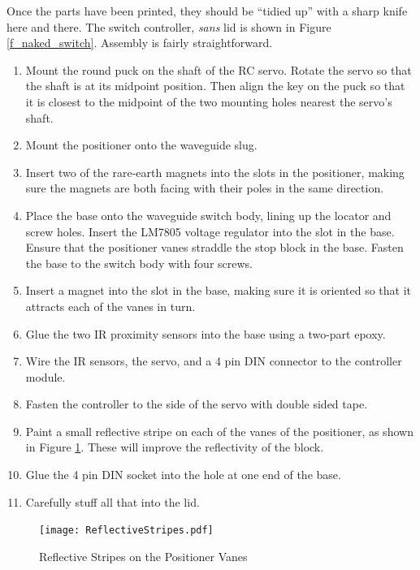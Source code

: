 \documentclass[12pt]{article}
\begin{document}
Once the parts have been printed, they should be ``tidied up'' with
a sharp knife here and there.  
The switch controller, {\em sans} lid is shown in Figure \ref{f_naked_switch}.
Assembly is fairly straightforward.

\begin{enumerate}
\setlength\itemsep{0em}  
\item Mount the round puck on the shaft of the RC servo. Rotate the
  servo so that the shaft is at its midpoint position. Then align
  the key on the puck so that it is closest to the midpoint of the
  two mounting holes nearest the servo's shaft.
\item Mount the positioner onto the waveguide slug.
\item Insert two of the rare-earth magnets into the slots in
  the positioner, making sure the magnets are both facing with
  their poles in the same direction.
\item Place the base onto the waveguide switch body, lining up
  the locator and screw holes. Insert the LM7805 voltage regulator
  into the slot in the base. Ensure that the positioner vanes
  straddle the stop block in the base. Fasten the base to the
  switch body with four screws.
\item Insert a magnet into the slot in the base, making sure
  it is oriented so that it attracts each of the vanes in turn.
\item Glue the two IR proximity sensors into the base using
  a two-part epoxy.
\item Wire the IR sensors, the servo, and a 4 pin DIN connector
  to the controller module.
\item Fasten the controller to the side of the servo with
  double sided tape.
\item Paint a small reflective stripe on each of the vanes of the
  positioner, as shown in Figure \ref{f_positioner_stripe}.
  These will improve the reflectivity of the block. 
\item Glue the 4 pin DIN socket into the hole at one end
  of the base.
  \item Carefully stuff all that into the lid. 
  \end{enumerate}


\begin{figure}[tb]
  \centering
  \texttt{[image: ReflectiveStripes.pdf]}
  \caption{\label{f_positioner_stripe}Reflective Stripes on the Positioner Vanes}
\end{figure}
\end{document}
